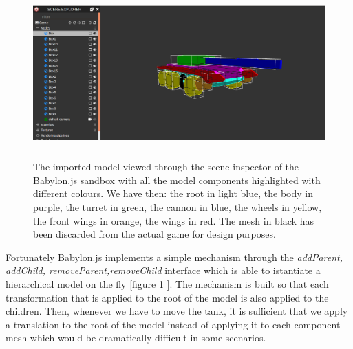 \documentclass[14pt]{article}
\begin{document}
\begin{figure}[H]
\center
\includegraphics[width=12cm, height= 6.5cm]{images/evidencedModel.png}
\caption{The imported model viewed through the scene inspector of the Babylon.js sandbox with all the model components highlighted with different colours. We have then: the root in light blue, the body in purple, the turret in green, the cannon in blue, the wheels in yellow, the front wings in orange, the wings in red. The mesh in black has been discarded from the actual game for design purposes.}
\label{img:modelInspection}
\end{figure}



Fortunately Babylon.js implements a simple mechanism through the \textit{addParent, addChild, removeParent,removeChild} interface which is able to istantiate a hierarchical model on the fly [figure \ref{img:modelInspection} ]. The mechanism is built so that each transformation that is applied to the root of the model is also applied to the children. Then, whenever we have to move the tank, it is sufficient that we apply a translation to the root of the model instead of applying it to each component mesh which would be dramatically difficult in some scenarios.\\
\end{document}
